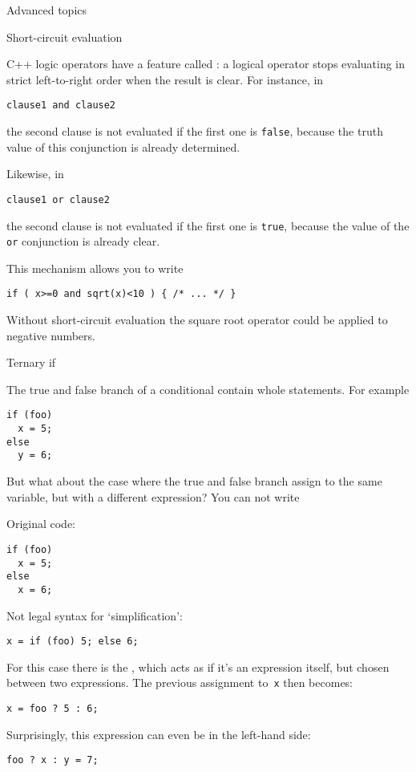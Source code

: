  {Advanced topics}
\label{sec:if-advanced}

 {Short-circuit evaluation}

C++ logic operators have a feature called
:
a logical operator stops evaluating
in strict left-to-right order
when the result is clear.
For instance, in
\begin{lstlisting}
clause1 and clause2
\end{lstlisting}
the second clause is not evaluated if the first one is
\lstinline{false}, because the truth value of this conjunction is
already determined.

Likewise, in
\begin{lstlisting}
clause1 or clause2
\end{lstlisting}
the second clause is not evaluated if the first one is \lstinline{true},
because the value of the \lstinline{or} conjunction is already clear.

This mechanism allows you to write
\begin{lstlisting}
if ( x>=0 and sqrt(x)<10 ) { /* ... */ }
\end{lstlisting}
Without short-circuit evaluation the square root operator could be applied to
negative numbers.

 {Ternary if}

The true and false branch of a conditional contain whole statements.
For example
\begin{lstlisting}
if (foo)
  x = 5;
else
  y = 6;
\end{lstlisting}
But what about the case where the true and false branch
assign to the same variable, but with a different expression?
You can not write
\begin{multicols}{2}
Original code:
\begin{lstlisting}
if (foo)
  x = 5;
else
  x = 6;
\end{lstlisting}
\columnbreak
Not legal syntax for `simplification':
\begin{lstlisting}
x = if (foo) 5; else 6; 
\end{lstlisting}
\end{multicols}
For this case there is the ,
which acts as if it's an expression itself, but chosen
between two expressions.
The previous assignment to~\lstinline{x} then becomes:
\begin{lstlisting}
x = foo ? 5 : 6;
\end{lstlisting}
Surprisingly, this expression can even be in the left-hand side:
\begin{lstlisting}
foo ? x : y = 7;
\end{lstlisting}

